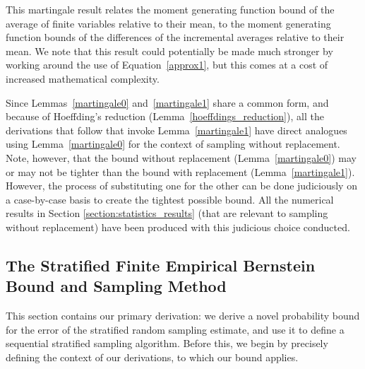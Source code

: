 This martingale result relates the moment generating function bound of the average of finite variables relative to their mean, to the moment generating function bounds of the  differences of the incremental averages relative to their mean. 
We note that this result could potentially be made much stronger by working around the use of Equation~\eqref{approx1}, but this comes at a cost of increased mathematical complexity.

Since Lemmas~\ref{martingale0} and~\ref{martingale1} share a common form, and because of Hoeffding's reduction (Lemma~\ref{hoeffdings_reduction}), 
all the derivations that follow that invoke Lemma~\ref{martingale1} have direct analogues using Lemma~\ref{martingale0} for the context of sampling without replacement.
Note, however, that the bound without replacement (Lemma~\ref{martingale0}) may or may not be tighter than the bound with replacement (Lemma~\ref{martingale1}). However, the process of substituting one for the other can be done judiciously on a case-by-case basis to create the tightest possible bound.
All the numerical results in Section \ref{section:statistics_results} (that are relevant to sampling without replacement) have been produced with this judicious choice conducted.

\subsection{The Stratified Finite Empirical Bernstein Bound and Sampling Method}
\label{sec:constructing}

This section contains our primary derivation: 
we derive a novel probability bound for the error of the stratified random sampling estimate, 
and use it to define a sequential stratified sampling algorithm. 
Before this, we begin by precisely defining the context of our derivations, to which our bound applies.

